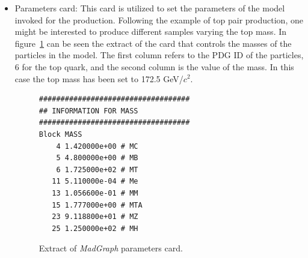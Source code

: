 \begin{itemize}
\begin{itemize}
    \item Parameters card: This card is utilized to set the parameters of the model invoked for the production. Following the example of top pair production, one might be interested to produce different samples varying the top mass. In figure~\ref{fig:ParamCard} can be seen the extract of the card that controls the masses of the particles in the model. The first column refers to the PDG ID of the particles, 6 for the top quark, and the second column is the value of the mass. In this case the top mass has been set to 172.5 GeV/$c^{2}$.
    \begin{figure}[!Hhtbp]
      \begin{center}
        \begin{minipage}[c]{0.45\textwidth}
\begin{verbatim}
###################################
## INFORMATION FOR MASS
###################################
Block MASS 
    4 1.420000e+00 # MC 
    5 4.800000e+00 # MB 
    6 1.725000e+02 # MT 
   11 5.110000e-04 # Me 
   13 1.056600e-01 # MM 
   15 1.777000e+00 # MTA 
   23 9.118800e+01 # MZ 
   25 1.250000e+02 # MH 
\end{verbatim}
        \end{minipage}
          \caption{Extract of \textit{MadGraph} parameters card.}
          \label{fig:ParamCard}
      \end{center}
    \end{figure}


\end{itemize}
\end{itemize}
